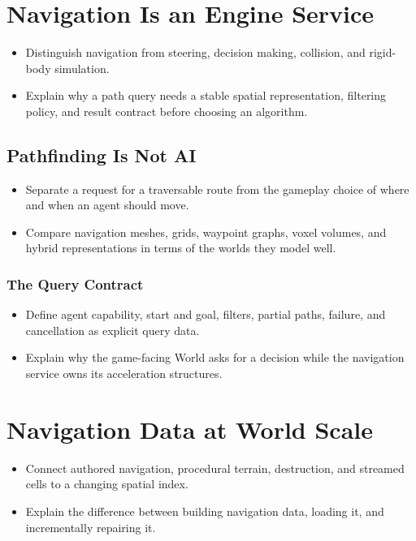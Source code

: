 \documentclass[
  11pt,
  letterpaper,
  DIV=11,
  numbers=noendperiod,
  twoside,
  open=right]{scrreprt}
\providecommand{\tightlist}{%
  \setlength{\itemsep}{0pt}\setlength{\parskip}{0pt}}
\begin{document}
\section{Navigation Is an Engine
Service}\label{navigation-is-an-engine-service}

\begin{itemize}
\tightlist
\item
  Distinguish navigation from steering, decision making, collision, and
  rigid-body simulation.
\item
  Explain why a path query needs a stable spatial representation,
  filtering policy, and result contract before choosing an algorithm.
\end{itemize}

\subsection{Pathfinding Is Not AI}\label{pathfinding-is-not-ai}

\begin{itemize}
\tightlist
\item
  Separate a request for a traversable route from the gameplay choice of
  where and when an agent should move.
\item
  Compare navigation meshes, grids, waypoint graphs, voxel volumes, and
  hybrid representations in terms of the worlds they model well.
\end{itemize}

\subsubsection{The Query Contract}\label{the-query-contract}

\begin{itemize}
\tightlist
\item
  Define agent capability, start and goal, filters, partial paths,
  failure, and cancellation as explicit query data.
\item
  Explain why the game-facing World asks for a decision while the
  navigation service owns its acceleration structures.
\end{itemize}

\section{Navigation Data at World
Scale}\label{navigation-data-at-world-scale}

\begin{itemize}
\tightlist
\item
  Connect authored navigation, procedural terrain, destruction, and
  streamed cells to a changing spatial index.
\item
  Explain the difference between building navigation data, loading it,
  and incrementally repairing it.
\end{itemize}
\end{document}
